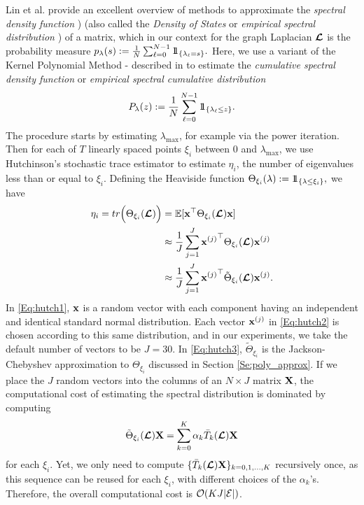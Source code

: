 \documentclass[journal, 10pt]{IEEEtran}
\begin{document}
Lin et al. \cite{lin_spectral_density} provide an excellent overview of methods to approximate the \emph{spectral density function} \cite[Chapter 6]{van_mieghem}) (also called the \emph{Density of States} or \emph{empirical spectral distribution} \cite[Chapter 2.4]{tao_random_matrix}) of a matrix, which in our context for the graph Laplacian $\boldsymbol{\mathcal{L}}$ is the probability measure 
$p_{\lambda}(s):=\frac{1}{N}\sum_{\ell=0}^{N-1} 1\!\!1_{\left\{\lambda_{\ell}=s\right\}}.$
Here, we use a variant of the Kernel Polynomial Method \cite{silver1994densities}\nocite{silver1996kernel}-\cite{wang1994calculating} described in \cite{lin_spectral_density} to estimate the \emph{cumulative spectral density function} or \emph{empirical spectral cumulative distribution}
\begin{align}
P_{\lambda}(z):=\frac{1}{N}\sum_{\ell=0}^{N-1} 1\!\!1_{\left\{\lambda_{\ell}\leq z\right\}}.
\end{align}
The procedure %
starts by estimating $\lambda_{\max}$, for example via the power iteration. Then for each of $T$ linearly spaced points $\xi_i$ between 0 and $\lambda_{\max}$, we use Hutchinson's stochastic trace estimator \cite{hutchinson} to estimate $\eta_i$, the number of eigenvalues less than or equal to $\xi_i$. Defining the Heaviside function $\Theta_{\xi_i}(\lambda):=1\!\!1_{\left\{\lambda \leq \xi_i\right\}},$ we have
\begin{align}
\eta_i =\mbox{tr}\Bigl(\Theta_{\xi_i}(\L)\Bigr) 
&=\mathbb{E}[{\bf x}^{\top}\Theta_{\xi_i}(\L){\bf x}] \label{Eq:hutch1}\\
&\approx \frac{1}{J} \sum_{j=1}^J {{\bf x}^{(j)}}^{\top}\Theta_{\xi_i}(\L){\bf x}^{(j)} \label{Eq:hutch2} \\
&\approx \frac{1}{J} \sum_{j=1}^J {{\bf x}^{(j)}}^{\top}\tilde{\Theta}_{\xi_i}(\L){\bf x}^{(j)}. \label{Eq:hutch3}
\end{align}
In \eqref{Eq:hutch1}, ${\bf x}$ is a random vector with each component having an independent and identical standard normal distribution. Each vector  ${\bf x}^{(j)}$ in \eqref{Eq:hutch2} is chosen according to this same distribution, and in our experiments, we take the default number of vectors to be $J=30$. In \eqref{Eq:hutch3}, $\tilde{\Theta}_{\xi_i}$ is the Jackson-Chebyshev approximation to ${\Theta}_{\xi_i}$ discussed in Section \ref{Se:poly_approx}.
If we place the $J$ random vectors into the columns of an $N \times J$ matrix ${\bf X}$, the computational cost of estimating the spectral distribution is dominated by computing 
\begin{align} \label{Eq:hutch4}
\tilde{\Theta}_{\xi_i}(\L){\bf X}=\sum_{k=0}^K \alpha_k \bar{T}_k(\L){\bf X}
\end{align}
 for each $\xi_i$. Yet, %
we only need to compute $\{ \bar{T}_k(\boldsymbol{\mathcal{L}}){\bf X}\}_{k=0,1,\ldots,K}$ recursively once, as this sequence can be reused for each $\xi_i$, with different choices of the $\alpha_k$'s. Therefore, the overall computational cost is ${\cal O}(KJ|\E|)$.
\end{document}
